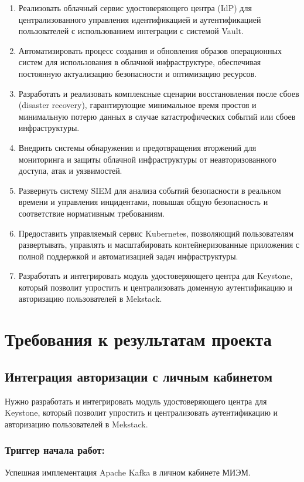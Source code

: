 \documentclass[14pt, a4paper]{extarticle}
\begin{document}
\begin{enumerate}
\item Реализовать облачный сервис удостоверяющего центра (IdP) для централизованного управления идентификацией и аутентификацией пользователей с использованием интеграции с системой Vault.
\item Автоматизировать процесс создания и обновления образов операционных систем для использования в облачной инфраструктуре, обеспечивая постоянную актуализацию безопасности и оптимизацию ресурсов.
\item Разработать и реализовать комплексные сценарии восстановления после сбоев (disaster recovery), гарантирующие минимальное время простоя и минимальную потерю данных в случае катастрофических событий или сбоев инфраструктуры.
\item Внедрить системы обнаружения и предотвращения вторжений для мониторинга и защиты облачной инфраструктуры от неавторизованного доступа, атак и уязвимостей.
\item Развернуть систему SIEM для анализа событий безопасности в реальном времени и управления инцидентами, повышая общую безопасность и соответствие нормативным требованиям.
\item Предоставить управляемый сервис Kubernetes, позволяющий пользователям развертывать, управлять и масштабировать контейнеризованные приложения с полной поддержкой и автоматизацией задач инфраструктуры.
\item Разработать и интегрировать модуль удостоверяющего центра для Keystone, который позволит упростить и централизовать доменную аутентификацию и авторизацию пользователей в Mekstack.
\end{enumerate}

\section{Требования к результатам проекта}

\subsection{Интеграция авторизации с личным кабинетом}

Нужно разработать и интегрировать модуль удостоверяющего центра для Keystone, который позволит упростить и централизовать аутентификацию и авторизацию пользователей в Mekstack.

\subsubsection*{Триггер начала работ:}
Успешная имплементация Apache Kafka в личном кабинете МИЭМ.
\end{document}
